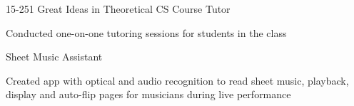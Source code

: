 
\begin{cventries}

  \cventry
    {} %
    {15-251 Great Ideas in Theoretical CS Course Tutor} %
    {}%
    {} %
    {
      \begin{cvitems} %
      \item {Conducted one-on-one tutoring sessions for students in the class
 }
      \end{cvitems}
    }

  \cventry
    {} %
    {Sheet Music Assistant} %
    {} %
    {} %
    {
      \begin{cvitems} %
        \item {Created app with optical and audio recognition to read sheet music, playback, display
                and auto-flip pages for musicians during live
                performance}
      \end{cvitems}
    }

\end{cventries}
